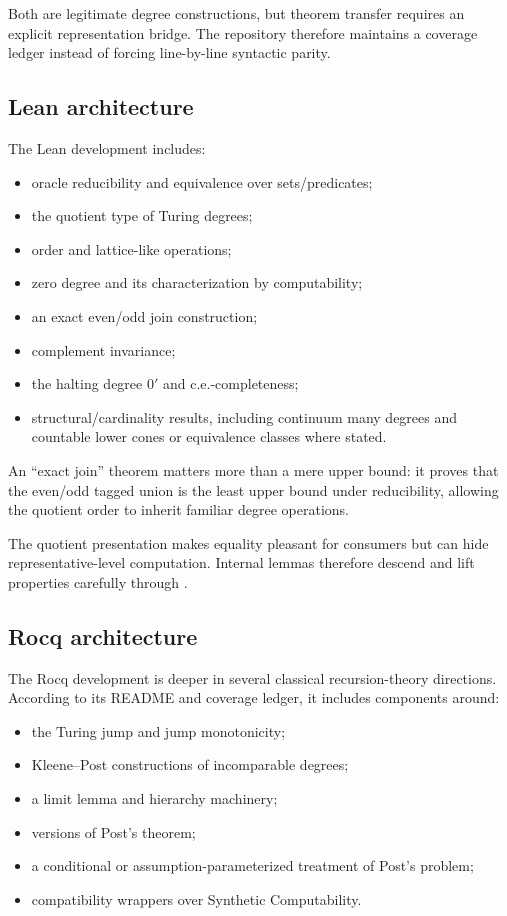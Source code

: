 \documentclass[
  10pt,
  a4paper,
  twoside,
  open=any,
  parskip=half,
  headings=big
]{scrreprt}
\newcommand{\code}[1]{\texttt{\detokenize{#1}}}
\begin{document}
Both are legitimate degree constructions, but theorem transfer requires an
explicit representation bridge.  The repository therefore maintains a
coverage ledger instead of forcing line-by-line syntactic parity.

\subsection{Lean architecture}

The Lean development includes:

\begin{itemize}
  \item oracle reducibility and equivalence over sets/predicates;
  \item the quotient type of Turing degrees;
  \item order and lattice-like operations;
  \item zero degree and its characterization by computability;
  \item an exact even/odd join construction;
  \item complement invariance;
  \item the halting degree \(0'\) and c.e.-completeness;
  \item structural/cardinality results, including continuum many degrees and
        countable lower cones or equivalence classes where stated.
\end{itemize}

An ``exact join'' theorem matters more than a mere upper bound: it proves that
the even/odd tagged union is the least upper bound under reducibility, allowing
the quotient order to inherit familiar degree operations.

The quotient presentation makes equality pleasant for consumers but can hide
representative-level computation.  Internal lemmas therefore descend and lift
properties carefully through \code{Quot.sound}.

\subsection{Rocq architecture}

The Rocq development is deeper in several classical recursion-theory
directions.  According to its README and coverage ledger, it includes
components around:

\begin{itemize}
  \item the Turing jump and jump monotonicity;
  \item Kleene--Post constructions of incomparable degrees;
  \item a limit lemma and hierarchy machinery;
  \item versions of Post's theorem;
  \item a conditional or assumption-parameterized treatment of Post's problem;
  \item compatibility wrappers over Synthetic Computability.
\end{itemize}
\end{document}
